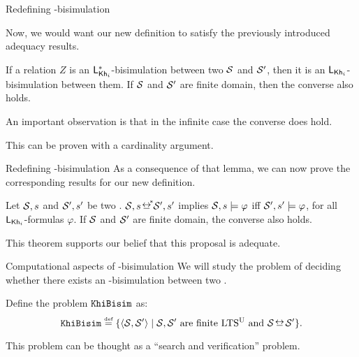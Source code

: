 \documentclass{beamer}
\begin{document}

\begin{frame}{Redefining \KHilogic-bisimulation}

    Now, we would want our new definition to satisfy the previously introduced adequacy results. \pause

    \begin{lemma}
        If a relation $Z$ is an $\mathsf{L}_{\operatorname{\sf Kh}_i}^*$-bisimulation between two \ults 
        $\mathcal{S}$ and $\mathcal{S}'$, then it is an $\mathsf{L}_{\operatorname{\sf Kh}_i}$-bisimulation between them. 
        If $\mathcal{S}$ and $\mathcal{S}'$ are finite domain, then the converse also holds.
    \end{lemma}\pause

    An important observation is that in the infinite case the converse does  hold.

    This can be proven with a cardinality argument.
\end{frame}


\begin{frame}{Redefining \KHilogic-bisimulation}
    As a consequence of that lemma, we can now prove the corresponding results for our new definition. \pause 
    
    \begin{theorem}
    Let $\mathcal{S},s$ and $\mathcal{S}',s'$ be two \ultss. $\model,s\nbisim\model',s'$ implies $\mathcal{S},s\models\varphi$ iff $\mathcal{S}',s'\models\varphi$, for all $\mathsf{L}_{\operatorname{\sf Kh}_i}$-formulas $\varphi$. If $\mathcal{S}$ and $\mathcal{S}'$ are finite domain, the converse also holds.
    \end{theorem}\pause

    This theorem supports our belief that this proposal is adequate. 

\end{frame}





\begin{frame}{Computational aspects of \KHilogic-bisimulation}
    We will study the problem of deciding whether there exists an \KHilogic-bisimulation between two \ultss. \pause
    
    \begin{definition}
        \begin{small}
        Define the problem $\mathtt{KhiBisim}$ as: 
            \[ 
            \khibisimpb \eqdef \set{\tup{\model,\model'} \mid \model,\model' \text{ are finite \ults  and }  \model \bisim\model'}.
            \]
        \end{small}
    \end{definition}\pause

    This problem can be thought as a ``search and verification'' problem.
\end{frame}
\end{document}
